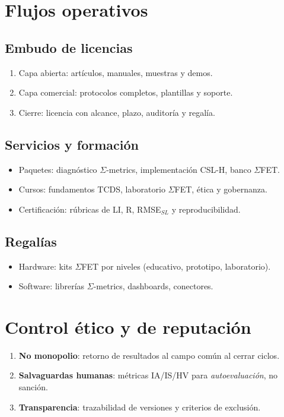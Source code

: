 \documentclass[12pt,letterpaper]{article}
\begin{document}
\section{Flujos operativos}
\subsection*{Embudo de licencias}
\begin{enumerate}
  \item Capa abierta: artículos, manuales, muestras y demos.
  \item Capa comercial: protocolos completos, plantillas y soporte.
  \item Cierre: licencia con alcance, plazo, auditoría y regalía.
\end{enumerate}

\subsection*{Servicios y formación}
\begin{itemize}
  \item Paquetes: diagnóstico $\Sigma$-metrics, implementación CSL-H, banco $\Sigma$FET.
  \item Cursos: fundamentos TCDS, laboratorio $\Sigma$FET, ética y gobernanza.
  \item Certificación: rúbricas de LI, R, RMSE$_{SL}$ y reproducibilidad.
\end{itemize}

\subsection*{Regalías}
\begin{itemize}
  \item Hardware: kits $\Sigma$FET por niveles (educativo, prototipo, laboratorio).
  \item Software: librerías $\Sigma$-metrics, dashboards, conectores.
\end{itemize}

\section{Control ético y de reputación}
\begin{enumerate}
  \item \textbf{No monopolio}: retorno de resultados al campo común al cerrar ciclos.
  \item \textbf{Salvaguardas humanas}: métricas IA/IS/HV para \emph{autoevaluación}, no sanción.
  \item \textbf{Transparencia}: trazabilidad de versiones y criterios de exclusión.
\end{enumerate}
\end{document}
